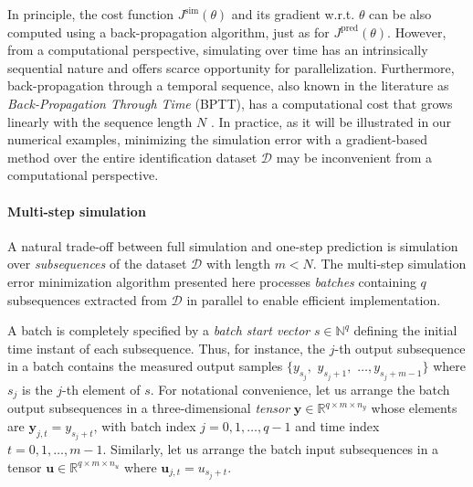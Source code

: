 \documentclass{article}
\newcommand{\batchsize}{q}
\newcommand{\seqlen}{m}
\newcommand{\tens}[1]{\mathbf{#1}}
\newcommand{\Did}{{\mathcal{D}}}
\begin{document}
In principle, the cost function $J^{\mathrm{sim}}(\theta)$ and its gradient w.r.t. $\theta$ can be also computed using  a back-propagation algorithm, just as for $J^{\mathrm{pred}}(\theta)$.
However, from a computational perspective, simulating over time has an intrinsically sequential nature and offers scarce opportunity for parallelization. Furthermore, back-propagation through a temporal sequence, also known in the literature as \emph{Back-Propagation Through Time} (BPTT), has a computational cost that grows linearly with the sequence length $N$  \citep{williams1995gradient}.
In practice, as it will be illustrated in our numerical examples, minimizing the simulation error with a gradient-based method over the entire identification dataset $\Did$ may be inconvenient from a computational perspective.

\paragraph{Multi-step simulation}
A natural trade-off between full simulation and one-step  prediction is simulation over  \emph{subsequences} of the dataset $\Did$ with length $m<N$. 
The multi-step simulation error minimization algorithm presented here processes \emph{batches} containing $\batchsize$ subsequences extracted from $\Did$ in parallel to enable efficient implementation.

A batch is completely specified by a \emph{batch start vector} $s \in \mathbb{N}^{\batchsize}$ defining the initial time instant of each subsequence. Thus, for instance, the $j$-th output subsequence in a batch   
contains the measured output samples $\{y_{s_j},$ $y_{s_j+1},$ $\dots, y_{s_j+m-1}\}$ where $s_j$ is the $j$-th element of $s$.
For notational convenience, let us arrange the batch output subsequences in a three-dimensional \emph{tensor} 
$\tens {y}\in\mathbb{R}^{\batchsize \times \seqlen \times n_y}$ whose elements are
$\tens {y}_{j,t} = y_{s_{j}+t}$, %
 with batch index $j\!=\!0,1,\dots,\batchsize\!-\!1$ and time index  $t\!=\!0,1,\dots,\seqlen\!-\!1$. 
Similarly, let us arrange the batch input subsequences in a tensor $\tens {u}\in\mathbb{R}^{\batchsize \times \seqlen \times n_u}$ where
$\tens {u}_{j,t} = u_{s_{j}+t}.$
\end{document}
